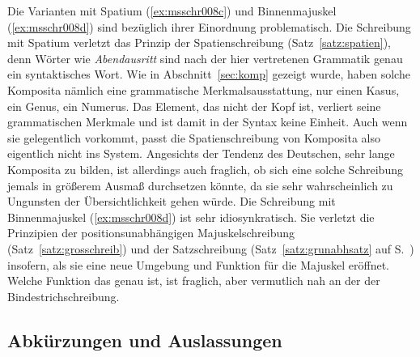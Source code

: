 Die Varianten mit Spatium (\ref{ex:msschr008c}) und Binnenmajuskel (\ref{ex:msschr008d}) sind bezüglich ihrer Einordnung problematisch.
Die Schreibung mit Spatium verletzt das Prinzip der Spatienschreibung (Satz~\ref{satz:spatien}), denn Wörter wie \textit{Abendausritt} sind nach der hier vertretenen Grammatik genau ein syntaktisches Wort.
Wie in Abschnitt~\ref{sec:komp} gezeigt wurde, haben solche Komposita nämlich eine grammatische Merkmalsausstattung, \zB nur einen Kasus, ein Genus, ein Numerus.
Das Element, das nicht der Kopf ist, verliert seine grammatischen Merkmale und ist damit in der Syntax keine Einheit.
Auch wenn sie gelegentlich vorkommt, passt die Spatienschreibung von Komposita also eigentlich nicht ins System.
Angesichts der Tendenz des Deutschen, sehr lange Komposita zu bilden, ist allerdings auch fraglich, ob sich eine solche Schreibung jemals in größerem Ausmaß durchsetzen könnte, da sie sehr wahrscheinlich zu Ungunsten der Übersichtlichkeit gehen würde.
Die Schreibung mit Binnenmajuskel (\ref{ex:msschr008d}) ist sehr idiosynkratisch.
Sie verletzt die Prinzipien der positionsunabhängigen Majuskelschreibung (Satz~\ref{satz:grosschreib}) und der Satzschreibung (Satz~\ref{satz:grunabhsatz} auf S.~\pageref{satz:grunabhsatz}) insofern, als sie eine neue Umgebung und Funktion für die Majuskel eröffnet.
Welche Funktion das genau ist, ist fraglich, aber vermutlich nah an der der Bindestrichschreibung.

\subsection{Abkürzungen und Auslassungen}

\label{sec:abkuerz}

